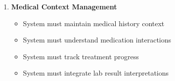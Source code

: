 \begin{enumerate}
    \item \textbf{Medical Context Management}
    \begin{itemize}
        \item System must maintain medical history context
        \item System must understand medication interactions
        \item System must track treatment progress
        \item System must integrate lab result interpretations
    \end{itemize}
\end{enumerate} 